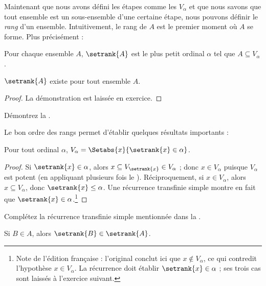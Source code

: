 \documentclass[../../../include/open-logic-section]{subfiles}
\begin{document}

Maintenant que nous avons défini les étapes comme les $V_\alpha$ et
que nous savons que tout ensemble est un sous-ensemble d'une certaine
étape, nous pouvons définir le \emph{rang} d'un ensemble.
Intuitivement, le rang de $A$ est le premier moment où $A$ se forme.
Plus précisément :

\begin{defn}
Pour chaque ensemble $A$, $\setrank{A}$ est le plus petit ordinal
$\alpha$ tel que $A \subseteq V_\alpha$.
\end{defn}
\begin{prop}
$\setrank{A}$ existe pour tout ensemble $A$.
\end{prop}
\begin{proof}
La démonstration est laissée en exercice.
\end{proof}
\begin{prob}
Démontrez la .
\end{prob}
\noindent
Le bon ordre des rangs permet d'établir quelques résultats importants :
\begin{prop}
Pour tout ordinal $\alpha$,
$V_\alpha = \Setabs{x}{\setrank{x} \in \alpha}$.
\end{prop}

\begin{proof}
Si $\setrank{x} \in \alpha$, alors
$x \subseteq V_{\setrank{x}} \in V_\alpha$ ; donc
$x \in V_\alpha$ puisque $V_\alpha$ est potent (en appliquant
plusieurs fois le ).
Réciproquement, si $x \in V_\alpha$, alors
$x \subseteq V_\alpha$, donc $\setrank{x} \leq \alpha$. Une
récurrence transfinie simple montre en fait que
$\setrank{x} \in \alpha$.\footnote{Note de l'édition française :
l'original conclut ici que $x \notin V_\alpha$, ce qui contredit
l'hypothèse $x \in V_\alpha$. La récurrence doit établir
$\setrank{x} \in \alpha$ ; ses trois cas sont laissés à l'exercice
suivant.}
\end{proof}
\begin{prob}
Complétez la récurrence transfinie simple mentionnée dans la
.
\end{prob}

\begin{prop}
Si $B \in A$, alors $\setrank{B} \in \setrank{A}$.
\end{prop}
\end{document}
